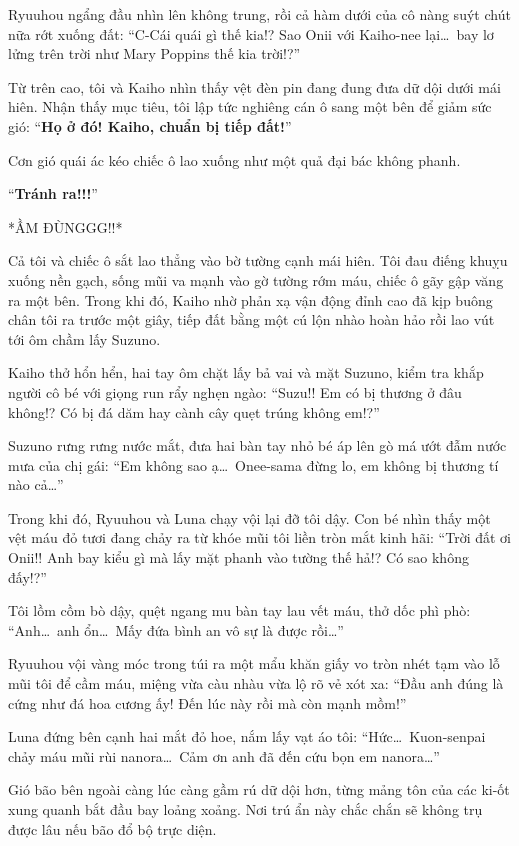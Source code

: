 \documentclass[../main.tex]{subfiles}
\begin{document}
Ryuuhou ngẩng đầu nhìn lên không trung, rồi cả hàm dưới của cô nàng suýt chút nữa rớt xuống đất: ``C-Cái quái gì thế kia!? Sao Onii với Kaiho-nee lại\dots\ bay lơ lửng trên trời như Mary Poppins thế kia trời!?''

Từ trên cao, tôi và Kaiho nhìn thấy vệt đèn pin đang đung đưa dữ dội dưới mái hiên. Nhận thấy mục tiêu, tôi lập tức nghiêng cán ô sang một bên để giảm sức gió: ``\textbf{Họ ở đó! Kaiho, chuẩn bị tiếp đất!}''

Cơn gió quái ác kéo chiếc ô lao xuống như một quả đại bác không phanh.

``\textbf{Tránh ra!!!}''

*ẦM ĐÙNGGG!!*

Cả tôi và chiếc ô sắt lao thẳng vào bờ tường cạnh mái hiên. Tôi đau điếng khuỵu xuống nền gạch, sống mũi va mạnh vào gờ tường rớm máu, chiếc ô gãy gập văng ra một bên. Trong khi đó, Kaiho nhờ phản xạ vận động đỉnh cao đã kịp buông chân tôi ra trước một giây, tiếp đất bằng một cú lộn nhào hoàn hảo rồi lao vút tới ôm chầm lấy Suzuno.

Kaiho thở hổn hển, hai tay ôm chặt lấy bả vai và mặt Suzuno, kiểm tra khắp người cô bé với giọng run rẩy nghẹn ngào: ``Suzu!! Em có bị thương ở đâu không!? Có bị đá dăm hay cành cây quẹt trúng không em!?''

Suzuno rưng rưng nước mắt, đưa hai bàn tay nhỏ bé áp lên gò má ướt đẫm nước mưa của chị gái: ``Em không sao ạ\dots\ Onee-sama đừng lo, em không bị thương tí nào cả\dots''

Trong khi đó, Ryuuhou và Luna chạy vội lại đỡ tôi dậy. Con bé nhìn thấy một vệt máu đỏ tươi đang chảy ra từ khóe mũi tôi liền tròn mắt kinh hãi: ``Trời đất ơi Onii!! Anh bay kiểu gì mà lấy mặt phanh vào tường thế hả!? Có sao không đấy!?''

Tôi lồm cồm bò dậy, quệt ngang mu bàn tay lau vết máu, thở dốc phì phò: ``Anh\dots\ anh ổn\dots\ Mấy đứa bình an vô sự là được rồi\dots''

Ryuuhou vội vàng móc trong túi ra một mẩu khăn giấy vo tròn nhét tạm vào lỗ mũi tôi để cầm máu, miệng vừa càu nhàu vừa lộ rõ vẻ xót xa: ``Đầu anh đúng là cứng như đá hoa cương ấy! Đến lúc này rồi mà còn mạnh mồm!''

Luna đứng bên cạnh hai mắt đỏ hoe, nắm lấy vạt áo tôi: ``Hức\dots\ Kuon-senpai chảy máu mũi rùi nanora\dots\ Cảm ơn anh đã đến cứu bọn em nanora\dots''

Gió bão bên ngoài càng lúc càng gầm rú dữ dội hơn, từng mảng tôn của các ki-ốt xung quanh bắt đầu bay loảng xoảng. Nơi trú ẩn này chắc chắn sẽ không trụ được lâu nếu bão đổ bộ trực diện.
\end{document}
